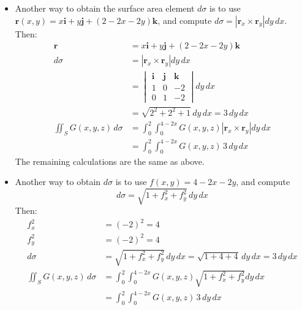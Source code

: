 {\begin{itemize}
    \item Another way to obtain the surface area element $d\sigma$ is to use $\mathbf r(x,y) = x\mathbf i + y \mathbf j + (2-2x-2y)\mathbf k$, and compute $d\sigma = |\mathbf r_x \times \mathbf r_y| dy\,dx$. Then:
    \begin{align}
        \mathbf r 
        &= x\mathbf i + y \mathbf j + (2-2x-2y)\mathbf k \\
        d\sigma 
        &= |\mathbf r_x \times \mathbf r_y| dy\,dx \\
        &= \begin{vmatrix} \mathbf i & \mathbf j & \mathbf k \\ 1 & 0 & -2\\0&1&-2 \end{vmatrix} dy\,dx \\
        &= \sqrt{2^2 + 2^2 + 1} \, dy\,dx = 3 \, dy\,dx \\
        \iint_S G(x,y,z) \, d\sigma 
        &= \int_0^2 \int_0^{4-2x} G(x,y,z)  |\mathbf r_x \times \mathbf r_y| dy\,dx \\
        &= \int_0^2 \int_0^{4-2x} G(x,y,z) \, 3 \, dy\, dx 
    \end{align}
    The remaining calculations are the same as above. 


    \item Another way to obtain $d\sigma$ is to use $f(x,y) = 4-2x-2y$, and compute $$d\sigma = \sqrt{1+f_x^2+f_y^2} \, dy\,dx$$
    Then:
        \begin{align}
            f_x^2 &= (-2)^2 = 4\\
            f_y^2 &= (-2)^2 = 4 \\
            d\sigma &= \sqrt{1+f_x^2+f_y^2} \, dy\,dx = \sqrt{1+4+4}\, dy\,dx = 3 \, dy\,dx \\
            \iint_S G(x,y,z) \, d\sigma 
        &= \int_0^2 \int_0^{4-2x} G(x,y,z)  \sqrt{1+f_x^2+f_y^2} dy\,dx \\
        & = \int_0^2 \int_0^{4-2x} G(x,y,z)\, 3 \, dy\, dx 
        \end{align}    

    \end{itemize}
    } 
   \else
      
   \fi
\fi 





